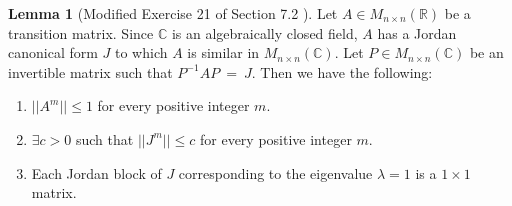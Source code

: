 \documentclass{amsart}
\theoremstyle{definition}
\newtheorem{lemma}[theorem]{Lemma}
\theoremstyle{remark}
\numberwithin{equation}{section}
\begin{document}
\begin{lemma}[Modified Exercise 21 of Section 7.2 \cite{friedberg2003linear}]\label{exericse7221}
    Let $A \in M_{n \times n}(\mathbb{R})$ be a transition matrix.
    Since $\mathbb{C}$ is an algebraically closed field, $A$ has a Jordan canonical form $J$ to which $A$ is
    similar in $M_{n \times n}(\mathbb{C})$.
    Let $P \in M_{n \times n}(\mathbb{C})$ be an invertible matrix such that $P^{-1}AP\ =\ J$.
    Then we have the following:

    \begin{enumerate}

        \item $||A^m|| \leq 1$ for every positive integer $m$.
        \item $\exists c > 0$ such that $||J^m|| \leq c$ for every positive integer $m$.
        \item Each Jordan block of $J$ corresponding to the eigenvalue $\lambda = 1$ is a $1 \times 1$ matrix.

    \end{enumerate}

\end{lemma}
\end{document}
